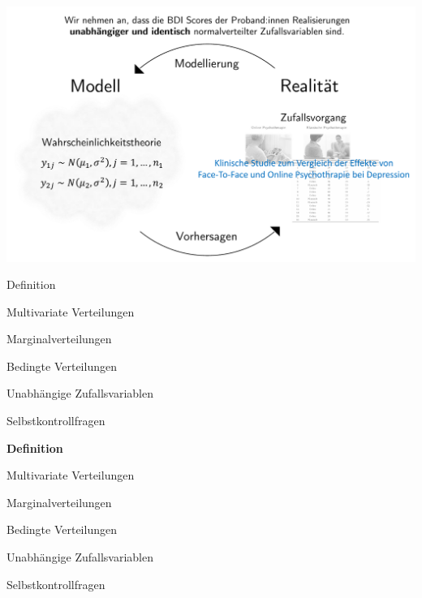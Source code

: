 \documentclass[
  8pt,
  ignorenonframetext,
]{beamer}
\begin{document}
\begin{frame}{}
\protect\hypertarget{section-3}{}
\vspace{4mm}

\begin{center}\includegraphics[width=0.9\linewidth]{5_Abbildungen/wtfi_5_wahrscheinlichkeitstheorie_modell_beispiel} \end{center}
\end{frame}

\begin{frame}{}
\protect\hypertarget{section-4}{}
\large
{}
\vfill

Definition

Multivariate Verteilungen

Marginalverteilungen

Bedingte Verteilungen

Unabhängige Zufallsvariablen

Selbstkontrollfragen

\vfill
\end{frame}

\begin{frame}{}
\protect\hypertarget{section-5}{}
\large
{}
\vfill

\textbf{Definition}

Multivariate Verteilungen

Marginalverteilungen

Bedingte Verteilungen

Unabhängige Zufallsvariablen

Selbstkontrollfragen

\vfill
\end{frame}
\end{document}
